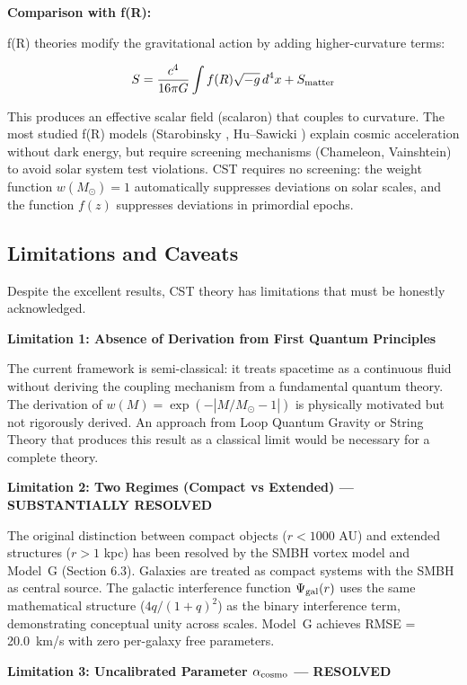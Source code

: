 \documentclass[11pt,a4paper]{article}
\begin{document}
\textbf{Comparison with f(R):}

f(R) theories modify the gravitational action by adding higher-curvature
terms:

\[S = \frac{c^4}{16\pi G}\int f(R)\sqrt{-g}\,d^4x + S_{\rm matter}\]

This produces an effective scalar field (scalaron) that couples to
curvature. The most studied f(R) models (Starobinsky \cite{Starobinsky1980}, Hu--Sawicki \cite{Hu2007})
explain cosmic acceleration without dark energy, but require screening
mechanisms (Chameleon, Vainshtein) to avoid solar system test
violations. CST requires no screening: the weight function
\(w(M_\odot) = 1\) automatically suppresses deviations on solar scales,
and the function \(f(z)\) suppresses deviations in primordial epochs.

\hypertarget{limitations-and-caveats}{%
\subsection{Limitations and
Caveats}\label{limitations-and-caveats}}

Despite the excellent results, CST theory has limitations that must be
honestly acknowledged.

\textbf{Limitation 1: Absence of Derivation from First Quantum
Principles}

The current framework is semi-classical: it treats spacetime as a
continuous fluid without deriving the coupling mechanism from a
fundamental quantum theory. The derivation of
\(w(M) = \exp(-|M/M_\odot - 1|)\) is physically motivated but not
rigorously derived. An approach from Loop Quantum Gravity or String
Theory that produces this result as a classical limit would be necessary
for a complete theory.

\textbf{Limitation 2: Two Regimes (Compact vs Extended) --- SUBSTANTIALLY RESOLVED}

The original distinction between compact objects (\(r < 1000\) AU) and extended structures (\(r > 1\) kpc) has been resolved by the SMBH vortex model and Model~G (Section 6.3). Galaxies are treated as compact systems with the SMBH as central source. The galactic interference function \(\Psi_{\rm gal}(r)\) uses the same mathematical structure (\(4q/(1+q)^2\)) as the binary interference term, demonstrating conceptual unity across scales. Model~G achieves RMSE = 20.0~km/s with zero per-galaxy free parameters.

\textbf{Limitation 3: Uncalibrated Parameter \(\alpha_{\rm cosmo}\) --- RESOLVED}
\end{document}
